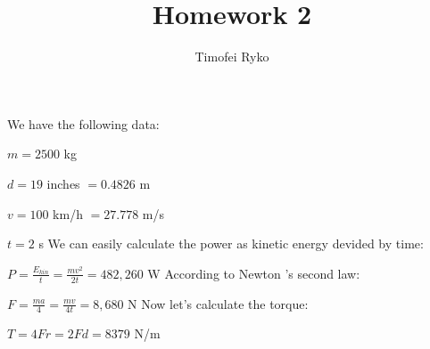 \documentclass[a4paper,12pt]{article}
\title{Homework 2}
\author{Timofei Ryko}
\begin{document}
\maketitle
\par
We have the following data:
\par
$m = 2500$ kg
\par
$d = 19$ inches $= 0.4826$ m
\par
$v = 100$ km/h $= 27.778$ m/s
\par
$t = 2$ s
\newline
We can easily calculate the power as kinetic energy devided by time:
\par
$P = \frac{E_{kin}}{t} = \frac{m v^2}{2t} = 482,260$ W
\newline
According to Newton 's second law:
\par
$F = \frac{ma}{4} = \frac{mv}{4t} = 8,680$ N
\newline
Now let's calculate the torque:
\par
$T = 4Fr = 2Fd = 8379$ N/m
\end{document}
